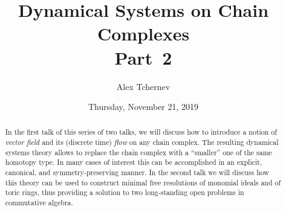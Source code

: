 \documentclass{UAmathtalk}
\author{Alex Tchernev}
\title{Dynamical Systems on Chain Complexes\\ Part~2}
\date{Thursday, November 21, 2019}
\begin{document}
\maketitle

\begin{abstract}
In the first talk of this series of two talks, we will discuss how to introduce a notion of \emph{vector field} and its (discrete time) \emph{flow} on any chain complex. The resulting dynamical systems theory allows to replace the chain complex with a “smaller” one of the same homotopy type. In many cases of interest this can be accomplished in an explicit, canonical, and symmetry-preserving manner. In the second talk we will discuss how this theory can be used to construct minimal free resolutions of monomial ideals and of toric rings, thus providing a solution to two long-standing open problems in commutative algebra.
\end{abstract}
\end{document}
